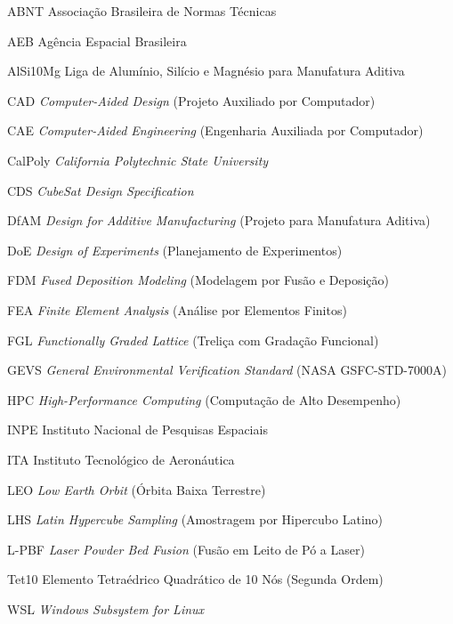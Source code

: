 
\begin{siglas}
  \item[ABNT] Associação Brasileira de Normas Técnicas
  \item[AEB] Agência Espacial Brasileira
  \item[AlSi10Mg] Liga de Alumínio, Silício e Magnésio para Manufatura Aditiva
  \item[CAD] \textit{Computer-Aided Design} (Projeto Auxiliado por Computador)
  \item[CAE] \textit{Computer-Aided Engineering} (Engenharia Auxiliada por Computador)
  \item[CalPoly] \textit{California Polytechnic State University}
  \item[CDS] \textit{CubeSat Design Specification}
  \item[DfAM] \textit{Design for Additive Manufacturing} (Projeto para Manufatura Aditiva)
  \item[DoE] \textit{Design of Experiments} (Planejamento de Experimentos)
  \item[FDM] \textit{Fused Deposition Modeling} (Modelagem por Fusão e Deposição)
  \item[FEA] \textit{Finite Element Analysis} (Análise por Elementos Finitos)
  \item[FGL] \textit{Functionally Graded Lattice} (Treliça com Gradação Funcional)
  \item[GEVS] \textit{General Environmental Verification Standard} (NASA GSFC-STD-7000A)
  \item[HPC] \textit{High-Performance Computing} (Computação de Alto Desempenho)
  \item[INPE] Instituto Nacional de Pesquisas Espaciais
  \item[ITA] Instituto Tecnológico de Aeronáutica
  \item[LEO] \textit{Low Earth Orbit} (Órbita Baixa Terrestre)
  \item[LHS] \textit{Latin Hypercube Sampling} (Amostragem por Hipercubo Latino)
  \item[L-PBF] \textit{Laser Powder Bed Fusion} (Fusão em Leito de Pó a Laser)
  \item[Tet10] Elemento Tetraédrico Quadrático de 10 Nós (Segunda Ordem)
  \item[WSL] \textit{Windows Subsystem for Linux}

\end{siglas}
